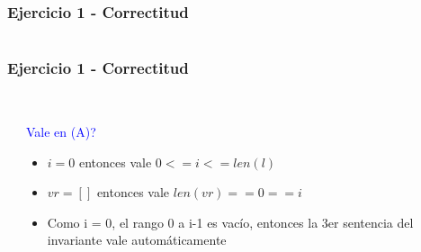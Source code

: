 \begin{frame}[fragile]\frametitle{Ejercicio 1 - Correctitud}
\begin{columns}
\begin{column}{0.35\textwidth}

\end{column}
\begin{column}{0.65\textwidth}


\end{column}
\end{columns}
\end{frame}



\begin{frame}[fragile]\frametitle{Ejercicio 1 - Correctitud}
\begin{columns}
\begin{column}{0.35\textwidth}

\end{column}
\begin{column}{0.65\textwidth}

\\
\textcolor{blue}{Vale \I en (A)?}
\begin{itemize}[<+->]
  \item $i = 0$ entonces vale $0 <= i <= len(l)$
  \item $vr = []$ entonces vale $len(vr) == 0 == i$
  \item Como i = 0, el rango 0 a i-1 es vac\'io, entonces la 3er sentencia del invariante vale autom\'aticamente
\end{itemize}

\end{column}
\end{columns}
\end{frame}

